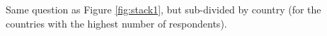 \label{fig:stack1}

Same question as Figure \ref{fig:stack1}, but sub-divided by country (for the countries with the highest number of respondents).